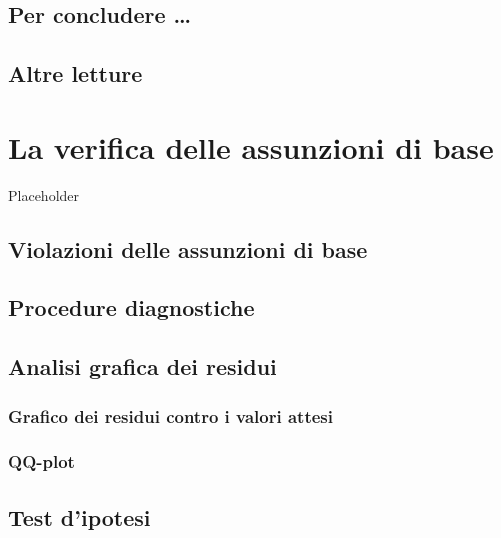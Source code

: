 \documentclass[a4paper,12pt,oneside]{book}
\begin{document}
\hypertarget{per-concludere}{%
\section{Per concludere \ldots{}}\label{per-concludere}}

\hypertarget{altre-letture-6}{%
\section{Altre letture}\label{altre-letture-6}}

\hypertarget{la-verifica-delle-assunzioni-di-base}{%
\chapter{La verifica delle assunzioni di base}\label{la-verifica-delle-assunzioni-di-base}}

Placeholder

\hypertarget{violazioni-delle-assunzioni-di-base}{%
\section{Violazioni delle assunzioni di base}\label{violazioni-delle-assunzioni-di-base}}

\hypertarget{procedure-diagnostiche}{%
\section{Procedure diagnostiche}\label{procedure-diagnostiche}}

\hypertarget{analisi-grafica-dei-residui}{%
\section{Analisi grafica dei residui}\label{analisi-grafica-dei-residui}}

\hypertarget{grafico-dei-residui-contro-i-valori-attesi}{%
\subsection{Grafico dei residui contro i valori attesi}\label{grafico-dei-residui-contro-i-valori-attesi}}

\hypertarget{qq-plot}{%
\subsection{QQ-plot}\label{qq-plot}}

\hypertarget{test-dipotesi-1}{%
\section{Test d'ipotesi}\label{test-dipotesi-1}}
\end{document}

